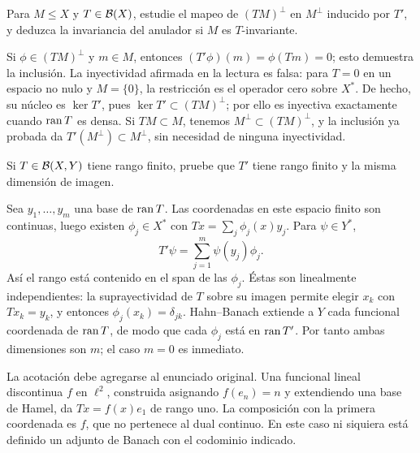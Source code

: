 \begin{ejercicio}\label{ej:v3-l04-3}
Para $M\le X$ y $T\in\mathcal B(X)$, estudie el mapeo de $(TM)^\perp$ en $M^\perp$ inducido por $T'$, y deduzca la invariancia del anulador si $M$ es $T$-invariante.
\end{ejercicio}
\begin{solucion}
Si $\phi\in(TM)^\perp$ y $m\in M$, entonces $(T'\phi)(m)=\phi(Tm)=0$; esto demuestra la inclusión. La inyectividad afirmada en la lectura es falsa: para $T=0$ en un espacio no nulo y $M=\{0\}$, la restricción es el operador cero sobre $X^*$. De hecho, su núcleo es $\ker T'$, pues $\ker T'\subset(TM)^\perp$; por ello es inyectiva exactamente cuando $\operatorname{ran} T$ es densa. Si $TM\subset M$, tenemos $M^\perp\subset(TM)^\perp$, y la inclusión ya probada da $T'(M^\perp)\subset M^\perp$, sin necesidad de ninguna inyectividad.
\end{solucion}

\begin{ejercicio}\label{ej:v3-l04-4}
Si $T\in\mathcal B(X,Y)$ tiene rango finito, pruebe que $T'$ tiene rango finito y la misma dimensión de imagen.
\end{ejercicio}
\begin{solucion}
Sea $y_1,\ldots,y_m$ una base de $\operatorname{ran} T$. Las coordenadas en este espacio finito son continuas, luego existen $\phi_j\in X^*$ con $Tx=\sum_j\phi_j(x)y_j$. Para $\psi\in Y^*$,
\[T'\psi=\sum_{j=1}^m\psi(y_j)\phi_j.
\]
Así el rango está contenido en el span de las $\phi_j$. Éstas son linealmente independientes: la suprayectividad de $T$ sobre su imagen permite elegir $x_k$ con $Tx_k=y_k$, y entonces $\phi_j(x_k)=\delta_{jk}$. Hahn--Banach extiende a $Y$ cada funcional coordenada de $\operatorname{ran} T$, de modo que cada $\phi_j$ está en $\operatorname{ran} T'$. Por tanto ambas dimensiones son $m$; el caso $m=0$ es inmediato.

La acotación debe agregarse al enunciado original. Una funcional lineal discontinua $f$ en $\ell^2$, construida asignando $f(e_n)=n$ y extendiendo una base de Hamel, da $Tx=f(x)e_1$ de rango uno. La composición con la primera coordenada es $f$, que no pertenece al dual continuo. En este caso ni siquiera está definido un adjunto de Banach con el codominio indicado.
\end{solucion}

